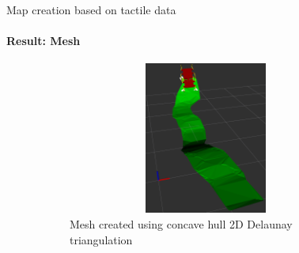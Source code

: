 \documentclass[aspectratio=169,xcolor=table]{beamer}
\begin{document}
\begin{frame}[t]{Map creation based on tactile data}
    \framesubtitle{Result: Mesh}
    \vspace{-15pt}
    \begin{figure}[H]
        \begin{subfigure}[t]{0.49\textwidth}
            \centering\includegraphics[height=5cm,width=1\textwidth,keepaspectratio]{mesh_rviz.png}
            \caption*{Mesh created using concave hull 2D Delaunay triangulation}
        \end{subfigure}
        \begin{subfigure}[t]{0.49\textwidth}
                \centering
\end{subfigure}
\end{figure}
\end{frame}
\end{document}
